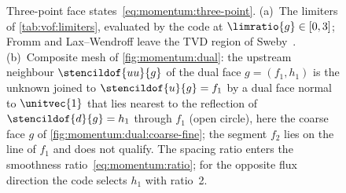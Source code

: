 \begin{figure}
\begin{subfigure}[b]{0.515\textwidth}
    \label{fig:momentum:limiter:stencil}
  \end{subfigure}
  \caption{Three-point face states~\cref{eq:momentum:three-point}. (a)~The
    limiters of \cref{tab:vof:limiters}, evaluated by the code at
    $\limratio{g}\in[0,3]$; Fromm and Lax--Wendroff leave the TVD region of
    Sweby~\cite{sweby1984}. (b)~Composite mesh of \cref{fig:momentum:dual}: the
    upstream neighbour $\stencildof{uu}{g}$ of the dual face
    $g=(f_1,h_1)$ is the unknown joined to $\stencildof{u}{g}=f_1$ by a dual
    face normal to $\unitvec{1}$ that lies nearest to the reflection of
    $\stencildof{d}{g}=h_1$ through $f_1$ (open circle), here the coarse face $g$
    of \cref{fig:momentum:dual:coarse-fine}; the segment $f_2$ lies on the line
    of $f_1$ and does not qualify. The spacing ratio enters the smoothness
    ratio~\cref{eq:momentum:ratio}; for the opposite flux direction the code
    selects $h_1$ with ratio~2.}
  \label{fig:momentum:limiter}
\end{figure}
